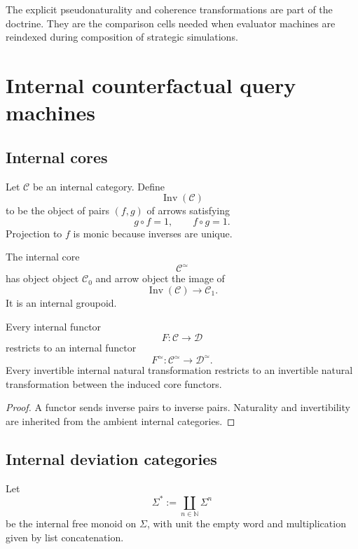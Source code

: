 The explicit pseudonaturality and coherence transformations are part of the doctrine. They are the
comparison cells needed when evaluator machines are reindexed during composition of strategic
simulations.

\section{Internal counterfactual query machines}
\label{sec:counterfactual-query-machines}

\subsection{Internal cores}

Let \(\mathcal C\) be an internal category. Define
\[
  \operatorname{Inv}(\mathcal C)
\]
to be the object of pairs \((f,g)\) of arrows satisfying
\[
  g\circ f=1,
  \qquad
  f\circ g=1.
\]
Projection to \(f\) is monic because inverses are unique.

\begin{definition}
\label{def:internal-core}
The internal core
\[
  \mathcal C^\simeq
\]
has object object \(\mathcal C_0\) and arrow object the image of
\[
  \operatorname{Inv}(\mathcal C)\longrightarrow\mathcal C_1.
\]
It is an internal groupoid.
\end{definition}

\begin{lemma}
\label{lem:core-functoriality}
Every internal functor
\[
  F:\mathcal C\to\mathcal D
\]
restricts to an internal functor
\[
  F^\simeq:\mathcal C^\simeq\to\mathcal D^\simeq.
\]
Every invertible internal natural transformation restricts to an invertible natural transformation
between the induced core functors.
\end{lemma}

\begin{proof}
A functor sends inverse pairs to inverse pairs. Naturality and invertibility are inherited from the
ambient internal categories.
\end{proof}

\subsection{Internal deviation categories}

Let
\[
  \Sigma^\ast
  :=
  \coprod_{n\in\mathbb N}\Sigma^n
\]
be the internal free monoid on \(\Sigma\), with unit the empty word and multiplication given by list
concatenation.

